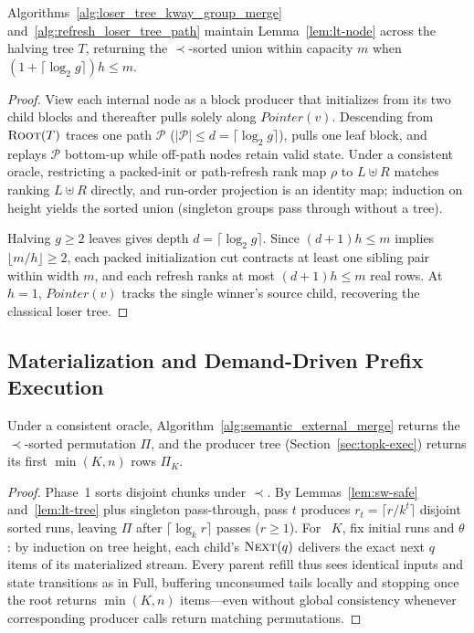 \begin{lemma}
\label{lem:lt-tree}
Algorithms~\ref{alg:loser_tree_kway_group_merge} and~\ref{alg:refresh_loser_tree_path} maintain Lemma~\ref{lem:lt-node} across the halving tree $T$, returning the $\prec$-sorted union within capacity $m$ when $(1+\lceil\log_2 g\rceil)h \le m$.
\end{lemma}
\begin{proof}
View each internal node as a block producer that initializes from its two child blocks and thereafter pulls solely along $\mathit{Pointer}(v)$. Descending from $\textsc{Root}(T)$ traces one path $\mathcal{P}$ ($|\mathcal{P}| \le d = \lceil\log_2 g\rceil$), pulls one leaf block, and replays $\mathcal{P}$ bottom-up while off-path nodes retain valid state. Under a consistent oracle, restricting a packed-init or path-refresh rank map $\rho$ to $L \uplus R$ matches ranking $L \uplus R$ directly, and run-order projection is an identity map; induction on height yields the sorted union (singleton groups pass through without a tree).

Halving $g \ge 2$ leaves gives depth $d = \lceil\log_2 g\rceil$. Since $(d+1)h \le m$ implies $\lfloor m/h \rfloor \ge 2$, each packed initialization cut contracts at least one sibling pair within width $m$, and each refresh ranks at most $(d+1)h \le m$ real rows. At $h{=}1$, $\mathit{Pointer}(v)$ tracks the single winner's source child, recovering the classical loser tree.
\end{proof}

\subsection{Materialization and Demand-Driven Prefix Execution}
\label{app:proof-limit}

\begin{theorem}
\label{thm:full-limit}
Under a consistent oracle, Algorithm~\ref{alg:semantic_external_merge} returns the $\prec$-sorted permutation $\Pi$, and the producer tree (Section~\ref{sec:topk-exec}) returns its first $\min(K,n)$ rows $\Pi_K$.
\end{theorem}
\begin{proof}
Phase~1 sorts disjoint chunks under $\prec$. By Lemmas~\ref{lem:sw-safe} and~\ref{lem:lt-tree} plus singleton pass-through, pass $t$ produces $r_t = \lceil r / k^t \rceil$ disjoint sorted runs, leaving $\Pi$ after $\lceil \log_k r \rceil$ passes ($r \ge 1$). For \LIMIT~$K$, fix initial runs and $\theta$: by induction on tree height, each child's $\textsc{Next}(q)$ delivers the exact next $q$ items of its materialized stream. Every parent refill thus sees identical inputs and state transitions as in Full, buffering unconsumed tails locally and stopping once the root returns $\min(K,n)$ items—even without global consistency whenever corresponding producer calls return matching permutations.
\end{proof}

